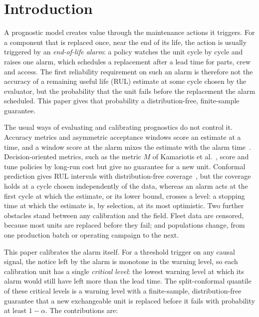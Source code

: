 \section{Introduction}\label{sec:intro}

A prognostic model creates value through the maintenance actions it triggers. For a component that is replaced once, near the end of its life, the action is usually triggered by an \emph{end-of-life alarm}: a policy watches the unit cycle by cycle and raises one alarm, which schedules a replacement after a lead time for parts, crew and access. The first reliability requirement on such an alarm is therefore not the accuracy of a remaining useful life (RUL) estimate at some cycle chosen by the evaluator, but the probability that the unit fails before the replacement the alarm scheduled. This paper gives that probability a distribution-free, finite-sample guarantee.

The usual ways of evaluating and calibrating prognostics do not control it. Accuracy metrics and asymmetric acceptance windows score an estimate at a time, and a window score at the alarm mixes the estimate with the alarm time~\cite{saxena2008,saxena2010}. Decision-oriented metrics, such as the metric $M$ of Kamariotis et al.~\cite{kamariotis2024}, score and tune policies by long-run cost but give no guarantee for a new unit. Conformal prediction gives RUL intervals with distribution-free coverage~\cite{javanmardi2023,robinson2026,wang2025robustuq}, but the coverage holds at a cycle chosen independently of the data, whereas an alarm acts at the first cycle at which the estimate, or its lower bound, crosses a level: a stopping time at which the estimate is, by selection, at its most optimistic. Two further obstacles stand between any calibration and the field. Fleet data are censored, because most units are replaced before they fail; and populations change, from one production batch or operating campaign to the next.

This paper calibrates the alarm itself. For a threshold trigger on any causal signal, the notice left by the alarm is monotone in the warning level, so each calibration unit has a single \emph{critical level}: the lowest warning level at which its alarm would still have left more than the lead time. The split-conformal quantile of these critical levels is a warning level with a finite-sample, distribution-free guarantee that a new exchangeable unit is replaced before it fails with probability at least $1-\alpha$. The contributions are:

